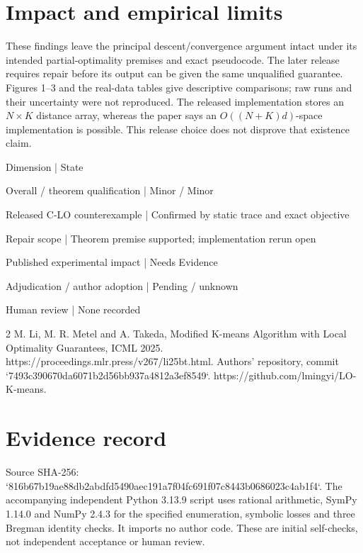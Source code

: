 \documentclass[10pt]{article}
\begin{document}
\section*{Impact and empirical limits}
These findings leave the principal descent/convergence argument intact under its intended partial-optimality premises and exact pseudocode. The later release requires repair before its output can be given the same unqualified guarantee. Figures 1–3 and the real-data tables give descriptive comparisons; raw runs and their uncertainty were not reproduced. The released implementation stores an \(N\times K\) distance array, whereas the paper says an \(O((N+K)d)\)-space implementation is possible. This release choice does not disprove that existence claim.\par
Dimension | State\par
Overall / theorem qualification | Minor / Minor\par
Released C-LO counterexample | Confirmed by static trace and exact objective\par
Repair scope | Theorem premise supported; implementation rerun open\par
Published experimental impact | Needs Evidence\par
Adjudication / author adoption | Pending / unknown\par
Human review | None recorded\par
2 M. Li, M. R. Metel and A. Takeda, Modified K-means Algorithm with Local Optimality Guarantees, ICML 2025. https://proceedings.mlr.press/v267/li25bt.html. Authors’ repository, commit `7493c390670da6071b2d56bb937a4812a3ef8549`. https://github.com/lmingyi/LO-K-means.\par
\section*{Evidence record}
Source SHA-256: `816b67b19ae88db2abdfd5490aec191a7f04fc691f07c8443b0686023c4ab1f4`. The accompanying independent Python 3.13.9 script uses rational arithmetic, SymPy 1.14.0 and NumPy 2.4.3 for the specified enumeration, symbolic losses and three Bregman identity checks. It imports no author code. These are initial self-checks, not independent acceptance or human review.\par
\end{document}

